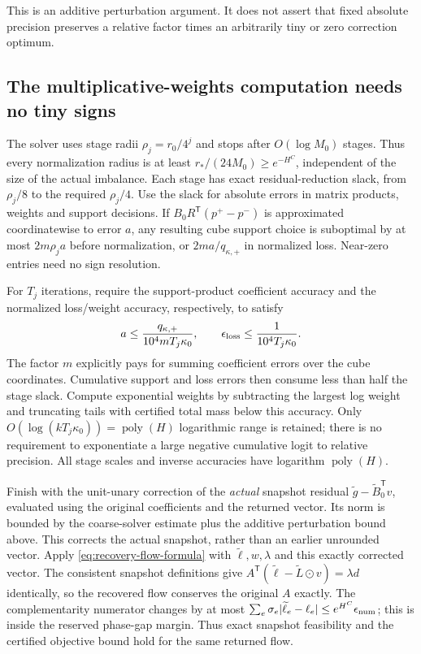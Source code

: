 \documentclass[11pt]{article}
\theoremstyle{definition}\newtheorem{definition}[theorem]{Definition}
\theoremstyle{remark}\newtheorem{remark}[theorem]{Remark}
\newcommand{\poly}{\operatorname{poly}}
\begin{document}
This is an additive perturbation argument. It does not assert that
fixed absolute precision preserves a relative factor times an
arbitrarily tiny or zero correction optimum.

\subsection{The multiplicative-weights computation needs no tiny signs}

The solver uses stage radii $\rho_j=r_0/4^j$ and stops after
$O(\log M_0)$ stages. Thus every normalization radius is at least
$r_*/(24M_0)\ge e^{-H^C}$, independent of the size of the actual
imbalance. Each stage has exact residual-reduction slack, from
$\rho_j/8$ to the required $\rho_j/4$.
Use the slack for absolute errors in matrix products, weights and
support decisions. If $B_0R^{\mathsf T}(p^+-p^-)$ is approximated
coordinatewise to error $a$, any resulting cube support choice is
suboptimal by at most $2m\rho_j a$ before normalization, or
$2ma/q_{\kappa,+}$ in normalized loss. Near-zero entries need no
sign resolution.

For $T_j$ iterations, require the support-product coefficient accuracy
and the normalized loss/weight accuracy, respectively, to satisfy
\[
 a\le\frac{q_{\kappa,+}}{10^4mT_j\kappa_0},\qquad
 \epsilon_{\rm loss}\le\frac1{10^4T_j\kappa_0}.
\]
The factor $m$ explicitly pays for summing coefficient errors over the
cube coordinates. Cumulative support and loss errors then consume less
than half the stage slack.
Compute exponential weights by subtracting the largest log weight and
truncating tails with certified total mass below this accuracy.
Only $O(\log(kT_j\kappa_0))=\poly(H)$ logarithmic range is retained;
there is no requirement to exponentiate a large negative cumulative
logit to relative precision. All stage scales and inverse accuracies
have logarithm $\poly(H)$.

Finish with the unit-unary correction of the \emph{actual} snapshot residual
$\widetilde g-\widetilde B_0^{\mathsf T}v$, evaluated using the original coefficients and
the returned vector. Its norm is bounded by the coarse-solver estimate
plus the additive perturbation bound above. This corrects the actual
snapshot, rather than an earlier unrounded vector.
Apply \eqref{eq:recovery-flow-formula} with $\widetilde\ell,w,\lambda$
and this exactly corrected vector. The consistent snapshot definitions
give $A^{\mathsf T}(\widetilde\ell-\widetilde L\odot v)=\lambda d$
identically, so the recovered flow conserves the original $A$ exactly.
The complementarity numerator changes by at most
$\sum_e\sigma_e|\widetilde\ell_e-\ell_e|
\le e^{H^C}\epsilon_{\rm num}$; this is inside the reserved phase-gap
margin. Thus exact snapshot feasibility and the certified objective
bound hold for the same returned flow.
\end{document}
